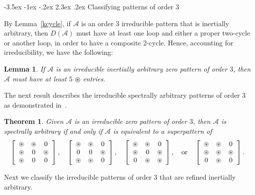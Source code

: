 \documentclass[10pt]{amsart}
\newtheorem{lemma}[proposition]{Lemma}
\newtheorem{theorem}[proposition]{Theorem}
\begin{document}
{               
                                      {-3.5ex \@plus -1ex \@minus -.2ex}                                      {2.3ex \@plus.2ex}                                                      {\normalfont\bfseries}}{Classifying patterns of order 3}\label{order3}

By Lemma~\ref{kcycle}, if ${\mathcal{A}}$ is an order $3$ irreducible pattern that is inertially arbitrary, then $D({\mathcal{A}})$ must have at least one 
loop and either a proper two-cycle or another loop, in order to have a composite $2$-cycle. Hence, accounting for irreducibility, we have
the following: 

\begin{lemma}\label{min5}
If ${\mathcal{A}}$ is an irreducible inertially arbitrary zero pattern of order $3$, then
${\mathcal{A}}$ must have at least $5$ ${\circledast}$ entries.
\end{lemma}

The next result describes the irreducible spectrally arbitrary patterns of order $3$ as demonstrated in~\cite{ESV}. 

\begin{theorem}\cite[Corollary~3.11]{ESV}\label{SAP3}
Given ${\mathcal{A}}$ is an 
irreducible zero pattern of order $3$, then ${\mathcal{A}}$ is spectrally arbitrary if and only if ${\mathcal{A}}$ is equivalent to 
a superpattern of
$$\left[ \begin{array}{ccc}
{\circledast} & {\circledast} & 0 \\
{\circledast} & 0 & {\circledast} \\
{\circledast} & 0 & 0\end{array} \right], \quad
\left[ \begin{array}{ccc}
{\circledast} & {\circledast} & 0 \\
0 & 0 & {\circledast} \\
{\circledast} & {\circledast} & 0\end{array} \right], \quad 
\left[ \begin{array}{ccc}
{\circledast} & {\circledast} & 0 \\
{\circledast} & 0 & {\circledast} \\
0  & {\circledast} & {\circledast} \end{array} \right], \quad {\rm or} \quad 
\left[ \begin{array}{ccc}
{\circledast} & {\circledast} & 0 \\
{\circledast} & {\circledast} & {\circledast} \\
0  & {\circledast} & 0 \end{array} \right].$$
\end{theorem}
Next we classify the irreducible patterns of order $3$ that are refined inertially arbitrary.  
\end{document}
